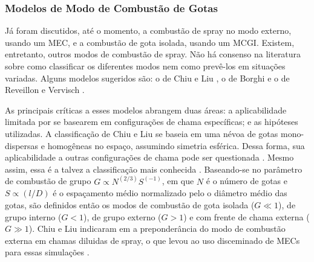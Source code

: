  



\subsubsection{Modelos de Modo de Combustão de Gotas}

Já foram discutidos, até o momento, a combustão de spray no modo externo, usando um MEC, e a combustão de gota isolada, usando um MCGI.
Existem, entretanto, outros modos de combustão de spray.
Não há consenso na literatura sobre como classificar os diferentes modos nem como prevê-los em situações variadas.
Alguns modelos sugeridos são: o de Chiu e Liu \cite{ChiuH1977,ChiuH1982}, o de Borghi \cite{Borghi1996} e o de Reveillon e Vervisch \cite{ReveillonJ2005}.%

As principais críticas a esses modelos abrangem duas áreas: a aplicabilidade limitada por se basearem em configurações de chama específicas; e as hipóteses utilizadas. 
A classificação de Chiu e Liu \cite{ChiuH1977,ChiuH1982} se baseia em uma névoa de gotas mono-dispersas e homogêneas no espaço, assumindo simetria esférica.
Dessa forma, sua aplicabilidade a outras configurações de chama pode ser questionada \cite{SacomanoF2017PhD}.
Mesmo assim, essa é a talvez a classificação mais conhecida \cite{JennyB2012}.
Baseando-se no parâmetro de combustão de grupo $G\propto N^{(2/3)} S^{(-1)}$, em que $N$ é o número de gotas e $S\propto (l/D)$ é o espaçamento médio normalizado pelo o diâmetro médio das gotas, 
são definidos então os modos de combustão de gota isolada ($G\ll1$), de grupo interno ($G<1$), de grupo externo ($G>1$) e com frente de chama externa ($G\gg1$).
Chiu e Liu indicaram em \cite{ChiuH1982} a preponderância do modo de combustão externa em chamas diluidas de spray, o que levou ao uso disceminado de MECs para essas simulações \cite{SacomanoF2017PhD}.

